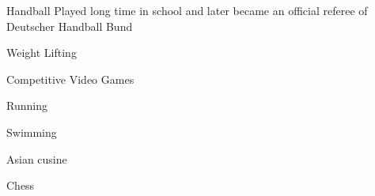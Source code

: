 



\begin{cvhonors}

  \cvhonor
    {Handball} %
    {Played long time in school and later became an official referee of Deutscher Handball Bund} %
    {} %
    {} %

  \cvhonor
    {Weight Lifting} %
    {} %
    {} %
    {} %

  \cvhonor
    {Competitive Video Games} %
    {} %
    {} %
    {} %

  \cvhonor
    {Running} %
    {} %
    {} %
    {} %

\end{cvhonors}




\begin{cvhonors}

  \cvhonor
    {Swimming} %
    {} %
    {} %
    {} %

  \cvhonor
  {Asian cusine} %
  {} %
  {} %
  {} %

  \cvhonor
  {Chess} %
  {} %
  {} %
  {} %

\end{cvhonors}
